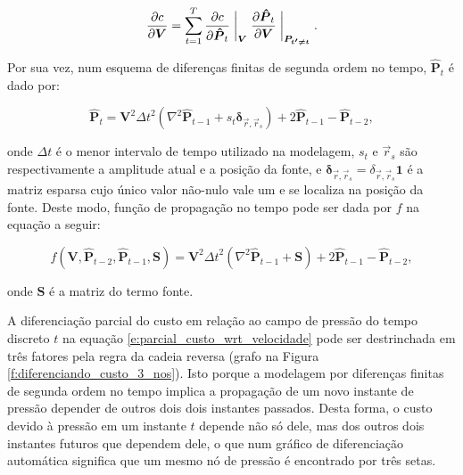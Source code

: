   \begin{equation} \label{e:parcial_custo_wrt_velocidade}
    \frac{\partial c}{\partial \boldsymbol{V}} =
      \sum \limits_{t=1}^T
      \frac{\partial c}{\partial \boldsymbol{\hat{P}}_t} \biggm\lvert_{\boldsymbol{V}}
      \frac{\partial \boldsymbol{\hat{P}}_t}{\partial \boldsymbol{V}} \biggm\lvert_{\boldsymbol{P_{t'\ne t}}}
    .
  \end{equation}

  Por sua vez, num esquema de diferenças finitas de segunda ordem no tempo, $\boldsymbol{\hat{P}}_t$ é dado por:

  \begin{equation} \label{e:fdm_rnn_cell}
    \boldsymbol{\hat{P}}_t =
      \boldsymbol{V}^2 {\Delta t}^2
      (\nabla^2 \boldsymbol{\hat{P}}_{t-1} + s_{t} \boldsymbol{\delta}_{\vec{r}, \vec{r}_s}) +
      2 \boldsymbol{\hat{P}}_{t-1} - 
      \boldsymbol{\hat{P}}_{t-2}
    ,
  \end{equation}

  \noindent onde $\Delta t$ é o menor intervalo de tempo utilizado na modelagem, $s_t$ e $\vec{r}_s$ são respectivamente a amplitude atual e a posição da fonte, e $\boldsymbol{\delta}_{\vec{r}, \vec{r}_s} = \delta_{\vec{r}, \vec{r}_s} \boldsymbol{1}$ é a matriz esparsa cujo único valor não-nulo vale um e se localiza na posição da fonte. Deste modo, função de propagação no tempo pode ser dada por $f$ na equação a seguir:

  \begin{equation} \label{e:fdm_rnn_cell_funcao}
    f(\boldsymbol{V}, \boldsymbol{\hat{P}}_{t-2}, \boldsymbol{\hat{P}}_{t-1}, \boldsymbol{S}) =
      \boldsymbol{V}^2 {\Delta t}^2
      (\nabla^2 \boldsymbol{\hat{P}}_{t-1} + \boldsymbol{S}) +
      2 \boldsymbol{\hat{P}}_{t-1} - 
      \boldsymbol{\hat{P}}_{t-2}
    ,
  \end{equation}

  \noindent onde $\boldsymbol{S}$ é a matriz do termo fonte.

  A diferenciação parcial do custo em relação ao campo de pressão do tempo discreto $t$ na equação \ref{e:parcial_custo_wrt_velocidade} pode ser destrinchada em três fatores pela regra da cadeia reversa (grafo na Figura \ref{f:diferenciando_custo_3_nos}). Isto porque a modelagem por diferenças finitas de segunda ordem no tempo implica a propagação de um novo instante de pressão depender de outros dois dois instantes passados. Desta forma, o custo devido à pressão em um instante $t$ depende não só dele, mas dos outros dois instantes futuros que dependem dele, o que num gráfico de diferenciação automática significa que um mesmo nó de pressão é encontrado por três setas.

